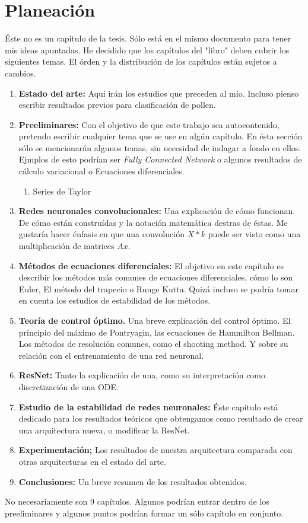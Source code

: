     \chapter{Planeación}
    Éste no es un capítulo de la tesis. Sólo está en el mismo documento para tener mis ideas apuntadas.
    He decidido que los capítulos del "libro" deben cubrir los siguientes temas. El órden y la distribución de los capítulos están sujetos a cambios.
    \begin{enumerate}
        \item \textbf{Estado del arte:} Aquí irán los estudios que preceden al mío. Incluso pienso escribir resultados previos para clasificación de pollen. 
        \item \textbf{Preeliminares:} Con el objetivo de que este trabajo sea autocontenido, pretendo escribir cualquier tema que se use en algún capítulo. En ésta sección sólo se mencionarán algunos temas, sin necesidad de indagar a fondo en ellos. Ejmplos de esto podrían ser \textsl{Fully Connected Network} o algunos resultados de cálculo variacional o Ecuaciones diferenciales.
        \begin{enumerate}
            \item Series de Taylor
        \end{enumerate}
        \item \textbf{Redes neuronales convolucionales:} Una explicación de cómo funcionan. De cómo están construídas y la notación matemática destras de éstas. Me gustaría hacer énfasis en que una convolución $X*k$ puede ser visto como una multiplicación de matrices $Ax$.
        \item  \textbf{Métodos de ecuaciones diferenciales:} El objetivo en este capítulo es describir los métodos más comunes de ecuaciones diferenciales, cómo lo son Euler, El método del trapecio o Runge Kutta. Quizá incluso se podría tomar en cuenta los estudios de estabilidad de los métodos.
        \item  \textbf{Teoría de control óptimo.} Una breve explicación del control óptimo. El principio del máximo de Pontryagin, las ecuaciones de Hammilton Bellman. Los métodos de resolución comunes, como el shooting method. Y sobre su relación con el entrenamiento de una red neuronal.
        \item \textbf{ResNet:} Tanto la explicación de una, como su interpretación como discretización de una ODE.
        \item \textbf{Estudio de la estabilidad de redes neuronales:} Éste capítulo está dedicado para los resultados teóricos que obtengamos como resultado de crear una arquitectura nueva, o modificar la ResNet.
        \item  \textbf{Experimentación;} Los resultados de nuestra arquitectura comparada con otras arquitecturas en el estado del arte.
        \item \textbf{Conclusiones:} Un breve resumen de los resultados obtenidos.
    \end{enumerate}
    No necesariamente son 9 capítulos. Algunos podrían entrar dentro de los preeliminares y algunos puntos podrían formar un sólo capítulo en conjunto.

